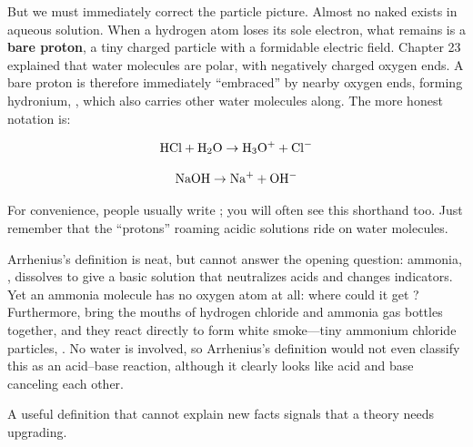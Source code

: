 But we must immediately correct the particle picture. Almost no naked  exists in aqueous solution. When a hydrogen atom loses its sole electron, what remains is a \textbf{bare proton}, a tiny charged particle with a formidable electric field. Chapter 23 explained that water molecules are polar, with negatively charged oxygen ends. A bare proton is therefore immediately ``embraced'' by nearby oxygen ends, forming hydronium, , which also carries other water molecules along. The more honest notation is:

\[\mathrm{HCl} + \mathrm{H_2O} \rightarrow \mathrm{H_3O^+} + \mathrm{Cl^-}\]

\[\mathrm{NaOH} \rightarrow \mathrm{Na^+} + \mathrm{OH^-}\]

For convenience, people usually write ; you will often see this shorthand too. Just remember that the ``protons'' roaming acidic solutions ride on water molecules.

Arrhenius's definition is neat, but cannot answer the opening question: ammonia, , dissolves to give a basic solution that neutralizes acids and changes indicators. Yet an ammonia molecule has no oxygen atom at all: where could it get ? Furthermore, bring the mouths of hydrogen chloride and ammonia gas bottles together, and they react directly to form white smoke---tiny ammonium chloride particles, . No water is involved, so Arrhenius's definition would not even classify this as an acid--base reaction, although it clearly looks like acid and base canceling each other.

A useful definition that cannot explain new facts signals that a theory needs upgrading.

